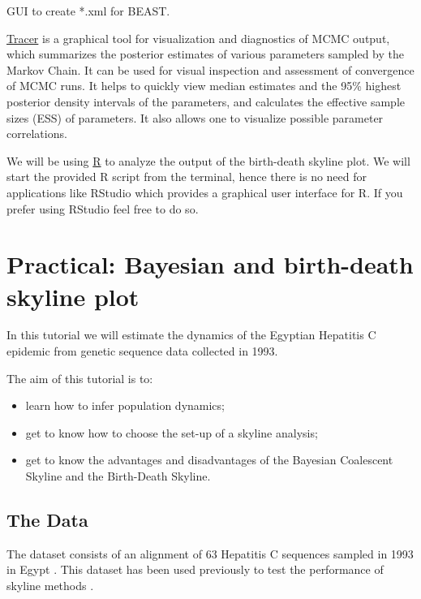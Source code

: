 \documentclass[11pt]{article}
\begin{document}

GUI to create *.xml for BEAST.


\href{http://tree.bio.ed.ac.uk/software/tracer}{Tracer} is a graphical tool for visualization and diagnostics of MCMC output, which summarizes the posterior estimates of various parameters sampled by the Markov Chain. It can be used for visual inspection and assessment of convergence of MCMC runs. It helps to quickly view median estimates and the 95\% highest posterior density intervals of the parameters, and calculates the effective sample sizes (ESS) of parameters. It also allows one to visualize possible parameter correlations.


We will be using \href{https://www.r-project.org}{R} to analyze the output of the birth-death skyline plot. We will start the provided R script from the terminal, hence there is no need for applications like RStudio which provides a graphical user interface for R. If you prefer using RStudio feel free to do so.

\newpage
\section{Practical: Bayesian and birth-death skyline plot}

In this tutorial we will estimate the dynamics of the Egyptian Hepatitis C epidemic from genetic sequence data collected in 1993.

The aim of this tutorial is to:
\begin{itemize}
\item learn how to infer population dynamics;
\item get to know how to choose the set-up of a skyline analysis;
\item get to know the advantages and disadvantages of the Bayesian Coalescent Skyline and the Birth-Death Skyline.
\end{itemize}

\bigskip
\subsection{The Data}
The dataset consists of an alignment of 63 Hepatitis C sequences sampled in 1993 in Egypt \citep{Ray2000}. This dataset has been used previously to test the performance of skyline methods \citep{Pybus2003,Drummond2005,Stadler2013}.
\end{document}
